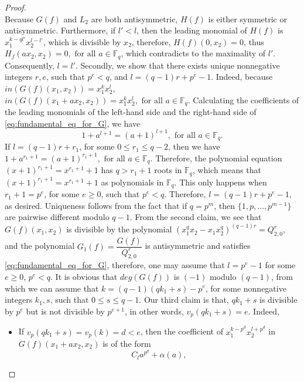 \documentclass[12pt,a4paper]{report}
\theoremstyle{definition}
\theoremstyle{remark}
\theoremstyle{definition}
\begin{document}
\begin{proof}
\begin{equation*}
\end{equation*}
Because $G(f)$ and $L_2$ are both antisymmetric, $H(f)$ is either symmetric or antisymmetric. Furthermore, if $l'<l$, then the leading monomial of $H(f)$ is $x_1^{k-ql'} x_2^{l-l'}$, which is divisible by $x_2$, therefore, $H(f)(0, x_2) = 0$, thus $H_f(ax_2, x_2) = 0, \text{ for all } a\in \mathbb{F}_q$, which contradicts to the maximality of $l'$. Consequently, $l = l'$.\smallbreak
Secondly, we show that there exists unique nonnegative integers $r, e$, such that $p^e < q$, and $l = (q-1)r + p^e - 1$. Indeed, because $in(G(f)(x_1, x_2)) = x_1^k x_2^l$, $in(G(f)(x_1+ax_2, x_2)) = x_1^k x_2^l, \text{ for all } a\in \mathbb{F}_q$. Calculating the coefficients of the leading monomials of the left-hand side and the right-hand side of \eqref{eq:fundamental_eq_for_G}, we have
\begin{equation*}
    1 + a^{l+1} = (a+1)^{l+1}, \text{ for all } a\in \mathbb{F}_q.
\end{equation*}
If $l = (q-1)r + r_1$, for some $0\le r_1\le q-2$, then we have $1+ a^{r_1+1} = (a+1)^{r_1+1}, \text{ for all } a\in \mathbb{F}_q$. Therefore, the polynomial equation $(x+1)^{r_1+1} = x^{r_1+1} + 1$ has $q>r_1+1$ roots in $\mathbb{F}_q$, which means that $(x+1)^{r_1+1} = x^{r_1+1} + 1$ as polynomials in $\mathbb{F}_q$. This only happens when $r_1+1 = p^e$, for some $e\geq 0$, such that $p^e < q$. Therefore, $l = (q-1)r + p^e-1$, as desired. Uniqueness follows from the fact that if $q = p^m$, then $\{1, p,\ldots, p^{m-1}\}$ are pairwise different modulo $q-1$.\smallbreak
From the second claim, we see that $G(f)(x_1, x_2)$ is divisible by the polynomial $(x_1^q x_2 - x_1 x_2^q)^{(q-1)r} = Q_{2, 0}^{r}$, and the polynomial $G_1(f) = \dfrac{G(f)}{Q_{2, 0}^{r}}$ is antisymmetric and satisfies \eqref{eq:fundamental_eq_for_G}, therefore, one may assume that $l = p^e - 1$ for some $e\ge 0$, $p^e<q$. It is obvious that $deg(G(f))$ is $(-1)$ modulo $(q-1)$, from which we can assume that $k = (q-1)(qk_1 + s) - p^e$, for some nonnegative integers $k_1, s$, such that $0\le s\le q-1$. Our third claim is that, $qk_1 + s$ is divisible by $p^e$ but is not divisible by $p^{e+1}$, in other words, $v_p(qk_1+s) = e$. Indeed, 
\begin{itemize}
    \item If $v_p(qk_1+s)=v_p(k) = d<e$, then the coefficient of $x_1^{k-p^d}x_2^{l+p^d}$ in $G(f)(x_1 + ax_2, x_2)$ is of the form 
\begin{equation*}
    C_l a^{p^d} + \alpha(a),
\end{equation*}

\end{itemize}
\end{proof}
\end{document}
